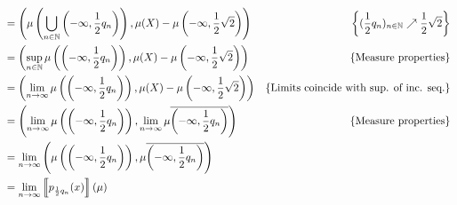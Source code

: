 \documentclass[a4paper,UKenglish,cleveref, autoref, thm-restate]{lipics-v2021}
\begin{document}
\begin{example}
\begin{align*}
                &
                \\
                & = \left (\mu \left (\bigcup_{n \in \mathbb{N}} 
                        \left (-\infty, \frac{1}{2} q_n \right )\right ), 
                \mu(X) - \mu \left (-\infty, \frac{1}{2}\sqrt{2} \right ) \right )
                & 
                \left \{(\frac{1}{2}q_n)_{n \in \mathbb{N}} 
                \nearrow \frac{1}{2}\sqrt{2} \right \}
                \\
                & = \left (\sup_{n \in \mathbb{N}} \mu \left ( 
                        \left (-\infty, \frac{1}{2} q_n \right )\right ), 
                \mu(X) - \mu \left (-\infty, \frac{1}{2}\sqrt{2} \right ) \right )
                & 
                \left \{ \text{Measure properties} \right \}
                \\
                & = \left (\lim_{n \to \infty} \mu \left ( 
                        \left (-\infty, \frac{1}{2} q_n \right )\right ), 
                \mu(X) - \mu \left (-\infty, \frac{1}{2}\sqrt{2} \right ) \right )
                & 
                \left \{ \text{Limits coincide with sup. of inc. seq.} \right \}                         \\
                & = \left (\lim_{n \to \infty} \mu \left ( 
                        \left (-\infty, \frac{1}{2} q_n \right )\right ), 
                \lim_{n \to \infty}
                \mu \overline{\left (-\infty, \frac{1}{2}q_n \right )} \right )
                & 
                \left \{ \text{Measure properties} \right \}
                \\
                & = \lim_{n \to \infty} \left (\mu \left ( 
                        \left (-\infty, \frac{1}{2} q_n \right )\right ), 
                \mu \overline{\left (-\infty, \frac{1}{2}q_n \right )} \right )
                & 
                \\
                & = \lim_{n \to \infty}
                \left \llbracket p_{\frac{1}{2}q_n}(x) \right \rrbracket(\mu)
                &
        \end{align*}
\end{example}
\end{document}
